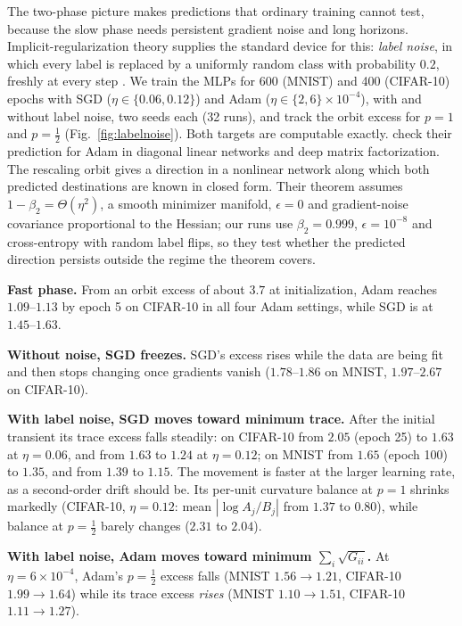 \documentclass[10pt]{article}
\theoremstyle{remark}
\begin{document}
The two-phase picture makes predictions that ordinary training cannot test, because the slow phase needs persistent gradient noise and long horizons. Implicit-regularization theory supplies the standard device for this: \emph{label noise}, in which every label is replaced by a uniformly random class with probability $0.2$, freshly at every step \citep{blanc2020implicit,damian2021label}. We train the MLPs for 600 (MNIST) and 400 (CIFAR-10) epochs with SGD ($\eta\in\{0.06,0.12\}$) and Adam ($\eta\in\{2,6\}\times10^{-4}$), with and without label noise, two seeds each (32 runs), and track the orbit excess for $p=1$ and $p=\tfrac12$ (Fig.~\ref{fig:labelnoise}). Both targets are computable exactly. \citet{li2025adam} check their prediction for Adam in diagonal linear networks and deep matrix factorization. The rescaling orbit gives a direction in a nonlinear network along which both predicted destinations are known in closed form. Their theorem assumes $1-\beta_2=\Theta(\eta^2)$, a smooth minimizer manifold, $\epsilon=0$ and gradient-noise covariance proportional to the Hessian; our runs use $\beta_2=0.999$, $\epsilon=10^{-8}$ and cross-entropy with random label flips, so they test whether the predicted direction persists outside the regime the theorem covers.

\textbf{Fast phase.} From an orbit excess of about $3.7$ at initialization, Adam reaches $1.09$--$1.13$ by epoch 5 on CIFAR-10 in all four Adam settings, while SGD is at $1.45$--$1.63$.

\textbf{Without noise, SGD freezes.} SGD's excess rises while the data are being fit and then stops changing once gradients vanish ($1.78$--$1.86$ on MNIST, $1.97$--$2.67$ on CIFAR-10).

\textbf{With label noise, SGD moves toward minimum trace.} After the initial transient its trace excess falls steadily: on CIFAR-10 from $2.05$ (epoch 25) to $1.63$ at $\eta=0.06$, and from $1.63$ to $1.24$ at $\eta=0.12$; on MNIST from $1.65$ (epoch 100) to $1.35$, and from $1.39$ to $1.15$. The movement is faster at the larger learning rate, as a second-order drift should be. Its per-unit curvature balance at $p=1$ shrinks markedly (CIFAR-10, $\eta=0.12$: mean $|\log A_j/B_j|$ from $1.37$ to $0.80$), while balance at $p=\tfrac12$ barely changes ($2.31$ to $2.04$).

\textbf{With label noise, Adam moves toward minimum $\sum_i\sqrt{G_{ii}}$.} At $\eta=6\times10^{-4}$, Adam's $p=\tfrac12$ excess falls (MNIST $1.56\to1.21$, CIFAR-10 $1.99\to1.64$) while its trace excess \emph{rises} (MNIST $1.10\to1.51$, CIFAR-10 $1.11\to1.27$).
\end{document}
